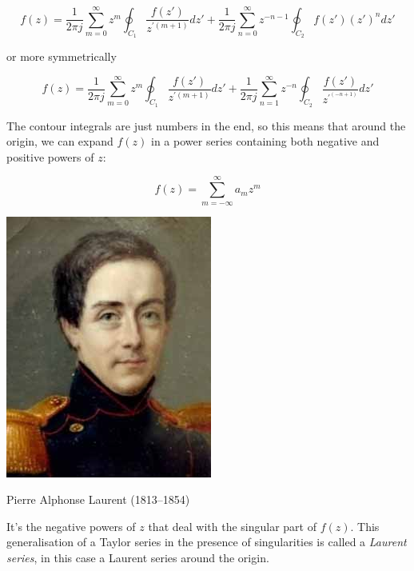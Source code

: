 \begin{equation}
f(z)=\frac{1}{2 \pi j } \sum_{m=0}^{\infty} z^m \oint_{{C}_1} \frac{f(z')}{z^{\prime (m+1)}} dz' + \frac{1}{2 \pi j } \sum_{n=0}^{\infty} z ^ {-n-1} \oint_{{C}_2}  {f(z')}  (z')^ n dz'
\end{equation} 

or more symmetrically

\begin{equation}
f(z)=\frac{1}{2 \pi j } \sum_{m=0}^{\infty} z^m \oint_{{C}_1} \frac{f(z')}{z^{\prime (m+1)}} dz' + \frac{1}{2 \pi j } \sum_{n=1}^{\infty} z ^ {-n} \oint_{{C}_2} \frac{f(z')}{z^{\prime^ {(-n+1)}}} dz'
\label{eq-laurent-int}
\end{equation} 

The contour integrals are just numbers in the end, so this means that around the origin, we can expand $f(z)$ in a power series containing both negative and positive powers of $z$:

\begin{equation}
f(z)= \sum_{m=-\infty}^{\infty} a_m z^m
\end{equation} 

\begin{marginfigure}[-5.5cm]
  \includegraphics{complex/figures/pierre_laurent}
  \caption{Pierre Alphonse Laurent (1813–1854)}
\end{marginfigure}

It's the negative powers of $z$ that deal with the singular part of $f(z)$. This generalisation of a Taylor series in the presence of singularities is called a \emph{Laurent series}, in this case a Laurent series around the origin.

